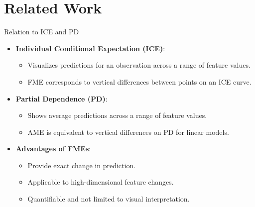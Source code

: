 \documentclass[11pt,compress,t,notes=noshow, aspectratio=169, xcolor=table]{beamer}
\begin{document}
\section{Related Work}

\begin{frame}{Relation to ICE and PD}
\begin{itemize}
\item \textbf{Individual Conditional Expectation (ICE)}:
\begin{itemize}
\item Visualizes predictions for an observation across a range of feature values.
\item FME corresponds to vertical differences between points on an ICE curve.
\end{itemize}
\item \textbf{Partial Dependence (PD)}:
\begin{itemize}
\item Shows average predictions across a range of feature values.
\item AME is equivalent to vertical differences on PD for linear models.
\end{itemize}
\item \textbf{Advantages of FMEs}:
\begin{itemize}
\item Provide exact change in prediction.
\item Applicable to high-dimensional feature changes.
\item Quantifiable and not limited to visual interpretation.
\end{itemize}
\end{itemize}
\end{frame}
\end{document}
